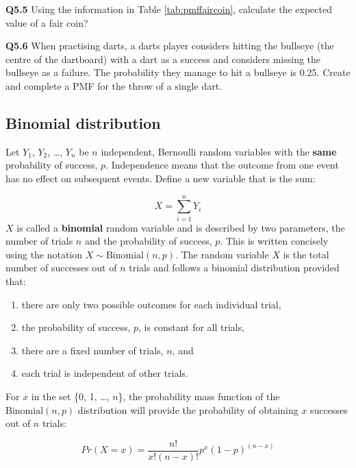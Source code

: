 \documentclass[
  oneside]{krantz}
\providecommand{\tightlist}{%
  \setlength{\itemsep}{0pt}\setlength{\parskip}{0pt}}
\begin{document}
\textbf{Q5.5} Using the information in Table \ref{tab:pmffaircoin}, calculate the expected value of a fair coin?

\textbf{Q5.6} When practising darts, a darts player considers hitting the bullseye (the centre of the dartboard) with a dart as a success and considers missing the bullseye as a failure. The probability they manage to hit a bullseye is 0.25. Create and complete a PMF for the throw of a single dart.

\hypertarget{binomial-distribution}{%
\subsection{Binomial distribution}\label{binomial-distribution}}

Let \(Y_1\), \(Y_2\), \ldots, \(Y_n\) be \(n\) independent, Bernoulli random variables with the \textbf{same} probability of success, \(p\). Independence means that the outcome from one event has no effect on subsequent events. Define a new variable that is the sum:

\[X = \sum_{i=1}^n Y_i\]
\(X\) is called a \textbf{binomial} random variable and is described by two parameters, the number of trials \(n\) and the probability of success, \(p\). This is written concisely using the notation \(X \sim \textrm{Binomial}(n, p)\). The random variable \(X\) is the total number of successes out of \(n\) trials and follows a binomial distribution provided that:

\begin{enumerate}
\def\labelenumi{\arabic{enumi}.}
\tightlist
\item
  there are only two possible outcomes for each individual trial,
\item
  the probability of success, \(p\), is constant for all trials,
\item
  there are a fixed number of trials, \(n\), and
\item
  each trial is independent of other trials.
\end{enumerate}

For \(x\) in the set \{0, 1, \ldots, \(n\)\}, the probability mass function of the \(\textrm{Binomial}(n, p)\) distribution will provide the probability of obtaining \(x\) successes out of \(n\) trials:

\begin{equation}
Pr(X=x) = \frac{n!}{x!(n-x)!}p^x (1-p)^{(n-x)}
\label{binompdf}
\end{equation}
\end{document}

